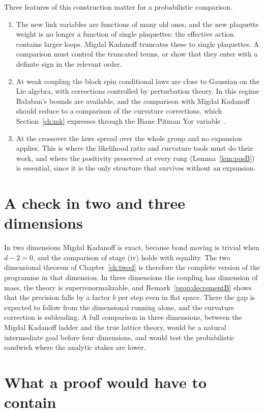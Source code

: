 Three features of this construction matter for a probabilistic comparison.
\begin{enumerate}
\item[(i)] The new link variables are functions of many old ones, and the new plaquette weight is no longer a function of single plaquettes: the effective action contains larger loops. Migdal Kadanoff truncates these to single plaquettes. A comparison must control the truncated terms, or show that they enter with a definite sign in the relevant order.
\item[(ii)] At weak coupling the block spin conditional laws are close to Gaussian on the Lie algebra, with corrections controlled by perturbation theory. In this regime Ba\l aban's bounds are available, and the comparison with Migdal Kadanoff should reduce to a comparison of the curvature corrections, which Section~\ref{ch:mk} expresses through the Biane Pitman Yor variable~\cite{BPY}.
\item[(iii)] At the crossover the laws spread over the whole group and no expansion applies. This is where the likelihood ratio and curvature tools must do their work, and where the positivity preserved at every rung (Lemma~\ref{lem:posB}) is essential, since it is the only structure that survives without an expansion.
\end{enumerate}

\section{A check in two and three dimensions}

In two dimensions Migdal Kadanoff is exact, because bond moving is trivial when $d-2=0$, and the comparison of stage (iv) holds with equality. The two dimensional theorem of Chapter~\ref{ch:twod} is therefore the complete version of the programme in that dimension. In three dimensions the coupling has dimension of mass, the theory is superrenormalizable, and Remark~\ref{prop:decrementB} shows that the precision falls by a factor $b$ per step even in flat space. There the gap is expected to follow from the dimensional running alone, and the curvature correction is subleading. A full comparison in three dimensions, between the Migdal Kadanoff ladder and the true lattice theory, would be a natural intermediate goal before four dimensions, and would test the probabilistic sandwich where the analytic stakes are lower.

\section{What a proof would have to contain}

